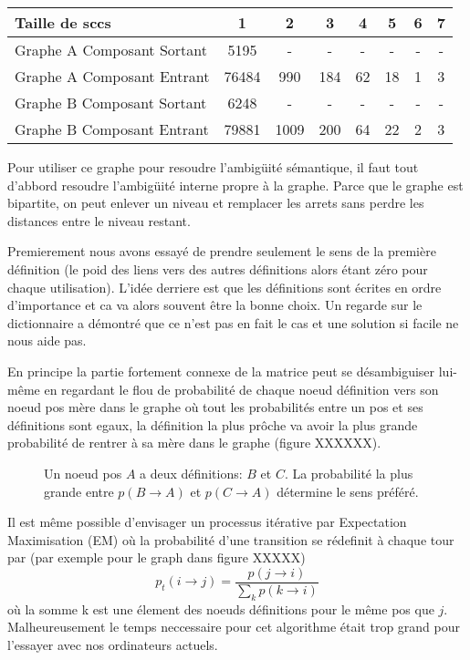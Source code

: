\begin{tabular}{|l|c|c|c|c|c|c|c|}
\hline
Taille de sccs               & 1      & 2    & 3   & 4  & 5  & 6  & 7 \\
\hline
Graphe A Composant Sortant   & 5195   & -    & -   & -  & -  & -  & -  \\
Graphe A Composant Entrant   & 76484  & 990  & 184 & 62 & 18 & 1  & 3 \\
\hline
Graphe B Composant Sortant   & 6248   & -    & -   & -  & -  & -  & -  \\
Graphe B Composant Entrant   & 79881  & 1009 & 200 & 64 & 22 & 2  & 3  \\
\hline
\end{tabular}

Pour utiliser ce graphe pour resoudre l'ambigüité sémantique, il
faut tout d'abbord resoudre l'ambigüité interne propre à la graphe.
Parce que le graphe est bipartite, on peut enlever un niveau et remplacer
les arrets sans perdre les distances entre le niveau restant.

Premierement nous avons essayé de prendre seulement le sens de la
première définition (le poid des liens vers des autres définitions
alors étant zéro pour chaque utilisation). L'idée derriere est que
 les définitions sont écrites en
ordre d'importance et ca va alors souvent être la bonne choix. Un regarde
 sur le dictionnaire a démontré que ce n'est pas en fait le cas et une
solution si facile ne nous aide pas.

En principe la partie fortement connexe de la matrice peut
 se désambiguiser lui-même en regardant le flou de probabilité de
chaque noeud définition vers son noeud pos mère dans le graphe où tout les
probabilités entre un pos et ses définitions sont egaux, la définition la
plus prôche va avoir la plus grande probabilité de rentrer à sa mère dans
le graphe (figure XXXXXX).


\begin{figure}
\centering
\parbox{5cm}{
\def\svgscale{0.5}

\caption{Un noeud pos $A$ a deux définitions: $B$ et $C$. La probabilité
la plus grande entre $p(B\rightarrow A)$ et $p(C\rightarrow A)$ détermine
le sens préféré.}
\label{fig:graphloop}}
\end{figure}

Il est même possible d'envisager un processus itérative par Expectation
Maximisation (EM) où la probabilité d'une transition se rédefinit à
chaque tour par (par exemple pour le graph dans figure XXXXX)
$$p_t(i\rightarrow j) = \frac{p(j\rightarrow i)}{\sum\limits_{k}p(k\rightarrow i)}$$
où la somme k est une élement des noeuds définitions pour le même pos que $j$.
Malheureusement le temps neccessaire pour cet algorithme était trop grand pour l'essayer avec nos ordinateurs actuels.
